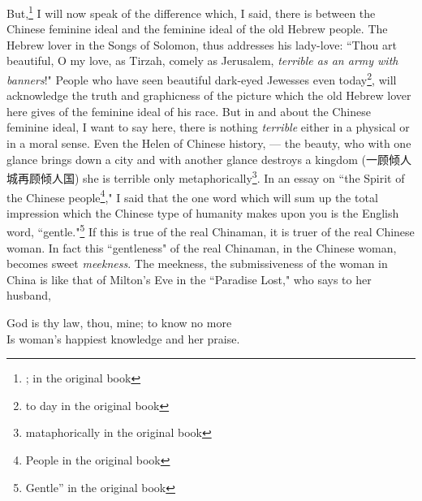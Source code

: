 But,\footnote{; in the original book} I will now speak of the difference which, I said, there is between the Chinese feminine ideal and the feminine ideal of the old Hebrew people.
The Hebrew lover in the Songs of Solomon, thus addresses his lady-love: ``Thou art beautiful, O my love, as Tirzah, comely as Jerusalem, \emph{terrible as an army with banners}!"
People who have seen beautiful dark-eyed Jewesses even today\footnote{to day in the original book}, will acknowledge the truth and graphicness of the picture which the old Hebrew lover here gives of the feminine ideal of his race.
But in and about the Chinese feminine ideal, I want to say here, there is nothing \emph{terrible} either in a physical or in a moral sense.
Even the Helen of Chinese history, --- the beauty, who with one glance brings down a city and with another glance destroys a kingdom (一顾倾人城再顾倾人国) she is terrible only metaphorically\footnote{mataphorically in the original book}.
In an essay on ``the Spirit of the Chinese people\footnote{People in the original book},"
I said that the one word which will sum up the total impression which the Chinese type of humanity makes upon you is the English word, ``gentle."\footnote{Gentle'' in the original book}
If this is true of the real Chinaman, it is truer of the real Chinese woman.
In fact this ``gentleness" of the real Chinaman, in the Chinese woman, becomes sweet \emph{meekness}.
The meekness, the submissiveness of the woman in China is like that of Milton's Eve in the ``Paradise Lost," who says to her husband,
\begin{center}
   God is thy law, thou, mine; to know no more\\
   Is woman's happiest knowledge and her praise.\\
\end{center}

